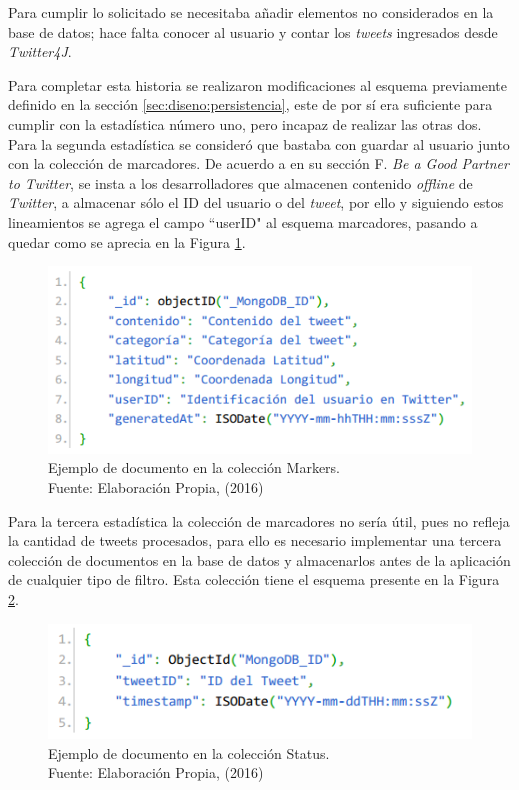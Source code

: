 Para cumplir lo solicitado se necesitaba añadir elementos no considerados en la base de datos; hace falta conocer al usuario y contar los \textit{tweets} ingresados desde \textit{Twitter4J}.

Para completar esta historia se realizaron modificaciones al esquema previamente definido en la sección \ref{sec:diseno:persistencia}, este de por sí era suficiente para cumplir con la estadística número uno, pero incapaz de realizar las otras dos. Para la segunda estadística se consideró que bastaba con guardar al usuario junto con la colección de marcadores. De acuerdo a \cite{TwitterAgreement} en su sección F. \textit{Be a Good Partner to Twitter}, se insta a los desarrolladores que almacenen contenido \textit{offline} de \textit{Twitter}, a almacenar sólo el ID del usuario o del \textit{tweet}, por ello y siguiendo estos lineamientos se agrega el campo ``userID" al esquema marcadores, pasando a quedar como se aprecia en la Figura \ref{fig:esquemaMarker2}.

\begin{figure}[H]
	\centering
	\captionsetup{justification=centering}
	\includegraphics[scale=0.8]{images/Marker2.png}
	\caption[Ejemplo de documento en la colección Markers.]{Ejemplo de documento en la colección Markers.\\Fuente: Elaboración Propia, (2016)}
	\label{fig:esquemaMarker2}
\end{figure}

Para la tercera estadística la colección de marcadores no sería útil, pues no refleja la cantidad de tweets procesados, para ello es necesario implementar una tercera colección de documentos en la base de datos y almacenarlos antes de la aplicación de cualquier tipo de filtro. Esta colección tiene el esquema presente en la Figura \ref{fig:esquemaTweet}.

\begin{figure}[H]
	\centering
	\captionsetup{justification=centering}
	\includegraphics[scale=0.8]{images/status.png}
	\caption[Ejemplo de documento en la colección Status.]{Ejemplo de documento en la colección Status.\\Fuente: Elaboración Propia, (2016)}
	\label{fig:esquemaTweet}
\end{figure}


